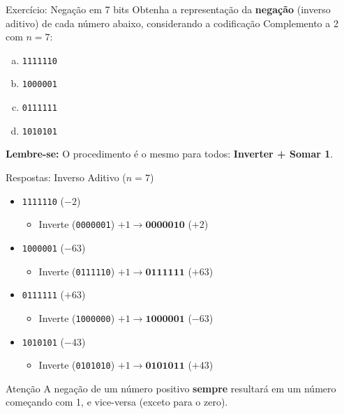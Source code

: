 \begin{frame}{Exercício: Negação em 7 bits}
    Obtenha a representação da \textbf{negação} (inverso aditivo) de cada número abaixo, considerando a codificação Complemento a 2 com $n=7$:

    \begin{enumerate}[a)]
        \item \texttt{1111110}
        \item \texttt{1000001}
        \item \texttt{0111111}
        \item \texttt{1010101}
    \end{enumerate}

    \vspace{0.4cm}
    \textbf{Lembre-se:} O procedimento é o mesmo para todos: \textbf{Inverter + Somar 1}.
\end{frame}

\begin{frame}{Respostas: Inverso Aditivo ($n=7$)}
    \begin{itemize}
        \item[\textbf{a)}] \texttt{1111110} ($-2$)
              \begin{itemize}
                  \item Inverte (\texttt{0000001}) $+ 1 \rightarrow \mathbf{0000010}$ ($+2$)
              \end{itemize}
        \item[\textbf{b)}] \texttt{1000001} ($-63$)
              \begin{itemize}
                  \item Inverte (\texttt{0111110}) $+ 1 \rightarrow \mathbf{0111111}$ ($+63$)
              \end{itemize}
        \item[\textbf{c)}] \texttt{0111111} ($+63$)
              \begin{itemize}
                  \item Inverte (\texttt{1000000}) $+ 1 \rightarrow \mathbf{1000001}$ ($-63$)
              \end{itemize}
        \item[\textbf{d)}] \texttt{1010101} ($-43$)
              \begin{itemize}
                  \item Inverte (\texttt{0101010}) $+ 1 \rightarrow \mathbf{0101011}$ ($+43$)
              \end{itemize}
    \end{itemize}

    \begin{alertblock}{Atenção}
        A negação de um número positivo \textbf{sempre} resultará em um número começando com 1, e vice-versa (exceto para o zero).
    \end{alertblock}
\end{frame}


